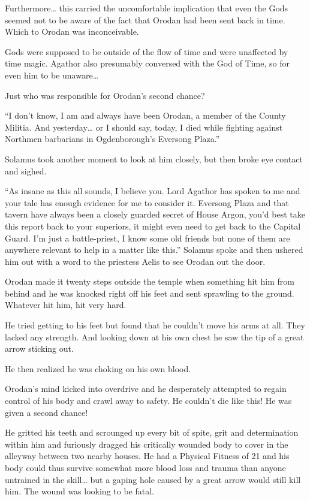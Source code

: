\documentclass[a4paper,10pt]{book}
\begin{document}
Furthermore… this carried the uncomfortable implication that even the Gods seemed not to be aware of the fact that Orodan had been sent back in time. Which to Orodan was inconceivable.\par
Gods were supposed to be outside of the flow of time and were unaffected by time magic. Agathor also presumably conversed with the God of Time, so for even him to be unaware…\par
Just who was responsible for Orodan’s second chance?\par
“I don’t know, I am and always have been Orodan, a member of the County Militia. And yesterday… or I should say, today, I died while fighting against Northmen barbarians in Ogdenborough’s Eversong Plaza.”\par
Solamus took another moment to look at him closely, but then broke eye contact and sighed.\par
“As insane as this all sounds, I believe you. Lord Agathor has spoken to me and your tale has enough evidence for me to consider it. Eversong Plaza and that tavern have always been a closely guarded secret of House Argon, you’d best take this report back to your superiors, it might even need to get back to the Capital Guard. I’m just a battle-priest, I know some old friends but none of them are anywhere relevant to help in a matter like this.” Solamus spoke and then ushered him out with a word to the priestess Aelis to see Orodan out the door.\par
Orodan made it twenty steps outside the temple when something hit him from behind and he was knocked right off his feet and sent sprawling to the ground. Whatever hit him, hit very hard.\par
He tried getting to his feet but found that he couldn’t move his arms at all. They lacked any strength. And looking down at his own chest he saw the tip of a great arrow sticking out.\par
He then realized he was choking on his own blood.\par
Orodan’s mind kicked into overdrive and he desperately attempted to regain control of his body and crawl away to safety. He couldn’t die like this! He was given a second chance!\par
He gritted his teeth and scrounged up every bit of spite, grit and determination within him and furiously dragged his critically wounded body to cover in the alleyway between two nearby houses. He had a Physical Fitness of 21 and his body could thus survive somewhat more blood loss and trauma than anyone untrained in the skill… but a gaping hole caused by a great arrow would still kill him. The wound was looking to be fatal.\par
\end{document}
